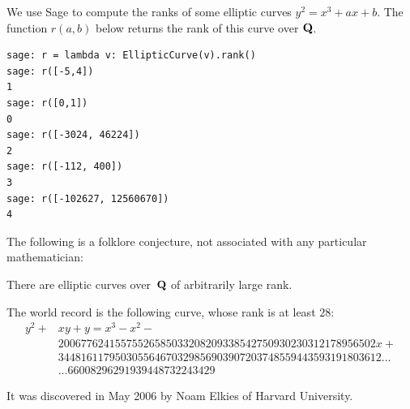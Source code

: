 \begin{sg}
We use Sage to compute the ranks of some elliptic curves $y^2 = x^3 + ax + b$.
The function $r(a,b)$ below returns the rank of this curve over $\mathbf{Q}$.
\begin{verbatim}
sage: r = lambda v: EllipticCurve(v).rank()
sage: r([-5,4])
1
sage: r([0,1])
0
sage: r([-3024, 46224])
2
sage: r([-112, 400])
3
sage: r([-102627, 12560670])
4
\end{verbatim}
\end{sg}

The following is a folklore conjecture, not associated with any
particular mathematician:
\begin{conjecture}\label{ref:rankconj}
There are elliptic curves over~$\mathbf{Q}$ of arbitrarily large rank.
\end{conjecture}

The world record 
is the following curve, whose rank is at least $28$:
\begin{align*}
y^2 + &xy + y = x^3 - x^2 - \\
   & 20067762415575526585033208209338542750930230312178956502x + \\
   & 344816117950305564670329856903907203748559443593191803612\ldots\\
   & \ldots 66008296291939448732243429
\end{align*}

It was discovered in May 2006 by Noam Elkies of Harvard
University.


